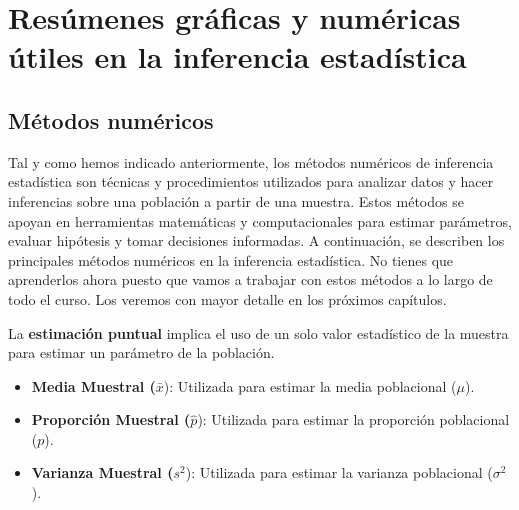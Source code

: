 \documentclass[
  letterpaper,
  DIV=11,
  numbers=noendperiod]{scrreprt}
\providecommand{\tightlist}{%
  \setlength{\itemsep}{0pt}\setlength{\parskip}{0pt}}\usepackage{longtable,booktabs,array}
\begin{document}
\hypertarget{resuxfamenes-gruxe1ficas-y-numuxe9ricas-uxfatiles-en-la-inferencia-estaduxedstica}{%
\section{Resúmenes gráficas y numéricas útiles en la inferencia
estadística}\label{resuxfamenes-gruxe1ficas-y-numuxe9ricas-uxfatiles-en-la-inferencia-estaduxedstica}}

\hypertarget{muxe9todos-numuxe9ricos}{%
\subsection{Métodos numéricos}\label{muxe9todos-numuxe9ricos}}

Tal y como hemos indicado anteriormente, los métodos numéricos de
inferencia estadística son técnicas y procedimientos utilizados para
analizar datos y hacer inferencias sobre una población a partir de una
muestra. Estos métodos se apoyan en herramientas matemáticas y
computacionales para estimar parámetros, evaluar hipótesis y tomar
decisiones informadas. A continuación, se describen los principales
métodos numéricos en la inferencia estadística. No tienes que
aprenderlos ahora puesto que vamos a trabajar con estos métodos a lo
largo de todo el curso. Los veremos con mayor detalle en los próximos
capítulos.

\begin{tcolorbox}[enhanced jigsaw, arc=.35mm, breakable, coltitle=black, left=2mm, opacityback=0, bottomtitle=1mm, colbacktitle=quarto-callout-note-color!10!white, title=\textcolor{quarto-callout-note-color}{\faInfo}\hspace{0.5em}{Estimación puntual}, titlerule=0mm, colback=white, colframe=quarto-callout-note-color-frame, bottomrule=.15mm, rightrule=.15mm, opacitybacktitle=0.6, toptitle=1mm, toprule=.15mm, leftrule=.75mm]

La \textbf{estimación puntual} implica el uso de un solo valor
estadístico de la muestra para estimar un parámetro de la población.

\begin{itemize}
\tightlist
\item
  \textbf{Media Muestral (}\(\bar{x}\)): Utilizada para estimar la media
  poblacional (\(\mu\)).
\item
  \textbf{Proporción Muestral (}\(\hat{p}\)): Utilizada para estimar la
  proporción poblacional (\(p\)).
\item
  \textbf{Varianza Muestral (}\(s^2\)): Utilizada para estimar la
  varianza poblacional (\(\sigma^2\)).
\end{itemize}

\end{tcolorbox}
\end{document}
